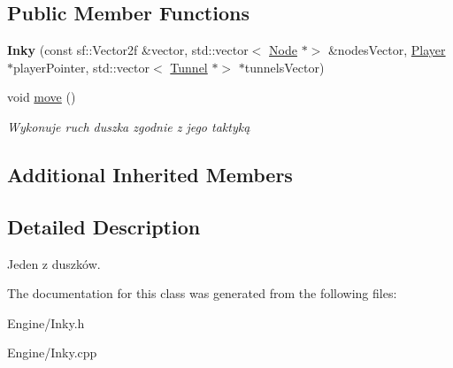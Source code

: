 \subsection*{Public Member Functions}
\begin{DoxyCompactItemize}
\item 
\mbox{\label{classInky_aa961db3b657615d617044c26ecfbd487}} 
{\bfseries Inky} (const sf\+::\+Vector2f \&vector, std\+::vector$<$ \hyperlink{classNode}{Node} $\ast$$>$ \&nodes\+Vector, \hyperlink{classPlayer}{Player} $\ast$player\+Pointer, std\+::vector$<$ \hyperlink{classTunnel}{Tunnel} $\ast$$>$ $\ast$tunnels\+Vector)
\item 
\mbox{\label{classInky_a693b31f383ea21c1164d482edb7d868c}} 
void \hyperlink{classInky_a693b31f383ea21c1164d482edb7d868c}{move} ()
\begin{DoxyCompactList}\small\item\em Wykonuje ruch duszka zgodnie z jego taktyką \end{DoxyCompactList}\end{DoxyCompactItemize}
\subsection*{Additional Inherited Members}


\subsection{Detailed Description}
Jeden z duszków. 

The documentation for this class was generated from the following files\+:\begin{DoxyCompactItemize}
\item 
Engine/Inky.\+h\item 
Engine/Inky.\+cpp\end{DoxyCompactItemize}
